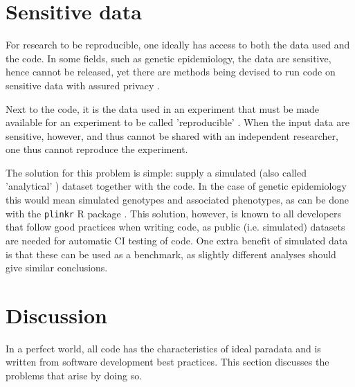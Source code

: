 \section{Sensitive data}\label{sec:sensitive-data}

For research to be reproducible, one ideally has access to
both the data used and the code.
In some fields, such as genetic epidemiology, the data are
sensitive, hence cannot be released,
yet there are methods being devised to run code on sensitive
data with assured privacy \cite{zhang2016review,azencott2018machine}.

Next to the code, it is the data used in an experiment 
that must be made available for an experiment 
to be called 'reproducible' \cite{peng2006reproducible}.
When the input data are sensitive, however, and thus cannot be shared with
an independent researcher, one thus cannot reproduce the
experiment.

The solution for this problem is simple:
supply a simulated (also called 'analytical' \cite{peng2006reproducible}) dataset
together with the code.
In the case of genetic epidemiology this would mean
simulated genotypes and associated phenotypes,
as can be done with the \verb|plinkr| R package \cite{plinkr}.
This solution, however, is known to all developers that follow
good practices when writing code, as public (i.e. simulated) 
datasets are needed for automatic CI testing of code.
One extra benefit of simulated data is that these can be used
as a benchmark, as slightly different analyses should give 
similar conclusions.

\section{Discussion}

In a perfect world, all code has the characteristics of ideal paradata
and is written from software development best practices.
This section discusses the problems that arise by doing so.


